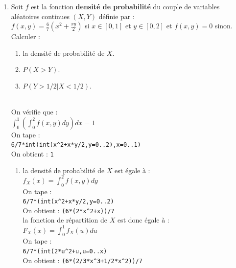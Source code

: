 \documentclass[a4paper,11pt]{book}
\begin{document}
\begin{enumerate}
\item Soit  $f$ est la fonction {\bf densit\'e de probabilit\'e} du couple de 
variables al\'eatoires continues $(X,Y)$ d\'efinie par :\\
$\displaystyle f(x,y)=\frac{6}{7}(x^2+\frac{xy}{2})$ si $x\in [0,1]$ et 
$y\in [0,2]$ et $f(x,y)=0$ sinon.\\
Calculer :
\begin{enumerate}
\item la densit\'e de probabilit\'e de $X$.
\item $P(X>Y)$.\\
\item $P(Y>1/2|X<1/2)$.
\end{enumerate}
\ \\
On v\'erifie que :\\
$\int_0^1(\int_0^2 f(x,y)dy)dx=1$\\
On tape :\\
{\tt 6/7*int(int(x\verb|^|2+x*y/2,y=0..2),x=0..1)}\\
On obtient : {\tt 1}
\begin{enumerate}
\item la densit\'e de probabilit\'e de $X$ est \'egale \`a :\\
$f_X(x)=\int_0^2f(x,y)dy$\\
On tape :\\
{\tt 6/7*(int(x\verb|^|2+x*y/2,y=0..2)}\\
On obtient : {\tt (6*(2*x\verb|^|2+x))/7}\\
la fonction de r\'epartition de $X$ est donc \'egale \`a :\\
$F_X(x)=\int_0^1f_X(u)du$\\
On tape :\\
{\tt 6/7*(int(2*u\verb|^|2+u,u=0..x)}\\
On obtient : {\tt (6*(2/3*x\verb|^|3+1/2*x\verb|^|2))/7}


\end{enumerate}
\end{enumerate}
\end{document}
